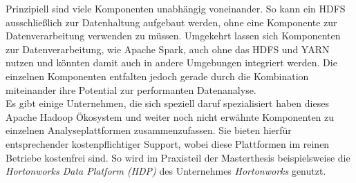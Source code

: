 \noindent
Prinzipiell sind viele Komponenten unabhängig voneinander. So kann ein HDFS ausschließlich zur Datenhaltung aufgebaut werden, ohne eine Komponente zur Datenverarbeitung verwenden zu müssen. Umgekehrt lassen sich Komponenten zur Datenverarbeitung, wie Apache Spark, auch ohne das HDFS und YARN nutzen und könnten damit auch in andere Umgebungen integriert werden. Die einzelnen Komponenten entfalten jedoch gerade durch die Kombination miteinander ihre Potential zur performanten Datenanalyse.\\

\noindent
Es gibt einige Unternehmen, die sich speziell daruf spezialisiert haben dieses Apache Hadoop Ökosystem und weiter noch nicht erwähnte Komponenten zu einzelnen Analyseplattformen zusammenzufassen. Sie bieten hierfür entsprechender kostenpflichtiger Support, wobei diese Plattformen im reinen Betriebe kostenfrei sind. So wird im Praxisteil der Masterthesis beispielsweise die \textit{Hortonworks Data Platform (HDP)} des Unternehmes \textit{Hortonworks} genutzt.


